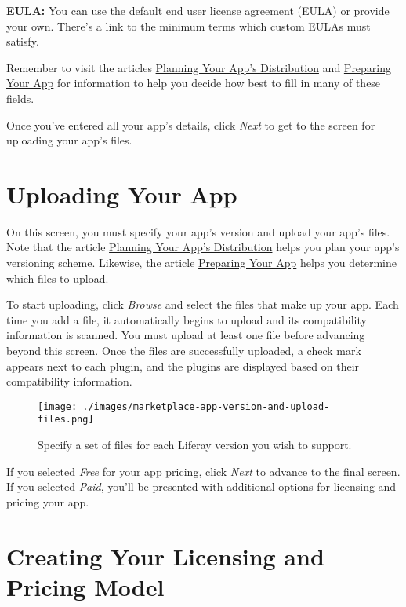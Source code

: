 \textbf{EULA:} You can use the default end user license agreement (EULA)
or provide your own. There's a link to the minimum terms which custom
EULAs must satisfy.

Remember to visit the articles
\href{/how-to-publish/-/knowledge_base/publish/planning-your-apps-distribution}{Planning
Your App's Distribution} and
\href{/how-to-publish/-/knowledge_base/publish/preparing-your-app}{Preparing
Your App} for information to help you decide how best to fill in many of
these fields.

Once you've entered all your app's details, click \emph{Next} to get to
the screen for uploading your app's files.

\section{Uploading Your App}\label{uploading-your-app}

On this screen, you must specify your app's version and upload your
app's files. Note that the article
\href{/how-to-publish/-/knowledge_base/publish/planning-your-apps-distribution}{Planning
Your App's Distribution} helps you plan your app's versioning scheme.
Likewise, the article
\href{/how-to-publish/-/knowledge_base/publish/preparing-your-app}{Preparing
Your App} helps you determine which files to upload.

To start uploading, click \emph{Browse} and select the files that make
up your app. Each time you add a file, it automatically begins to upload
and its compatibility information is scanned. You must upload at least
one file before advancing beyond this screen. Once the files are
successfully uploaded, a check mark appears next to each plugin, and the
plugins are displayed based on their compatibility information.

\begin{figure}
\centering
\texttt{[image: ./images/marketplace-app-version-and-upload-files.png]}
\caption{Specify a set of files for each Liferay version you wish to
support.}
\end{figure}

If you selected \emph{Free} for your app pricing, click \emph{Next} to
advance to the final screen. If you selected \emph{Paid}, you'll be
presented with additional options for licensing and pricing your app.

\section{Creating Your Licensing and Pricing
Model}\label{creating-your-licensing-and-pricing-model}

